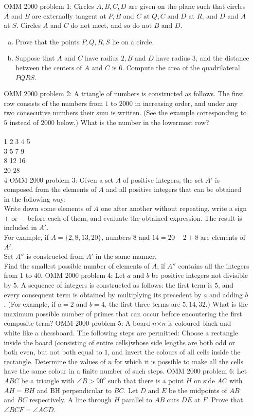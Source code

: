 OMM 2000 problem 1:  Circles $A,B,C,D$ are given on the plane such that circles $A$ and $B$ are externally tangent at $P, B$ and $C$ at $Q, C$ and $D$ at $R$, and $D$ and $A$ at $S$. Circles $A$ and $C$ do not meet, and so do not $B$ and $D$.
\begin{enumerate}[(a)]
  \item Prove that the points $P,Q,R,S$ lie on a circle.
  \item Suppose that $A$ and $C$ have radius $2, B$ and $D$ have radius $3$, and the distance between the centers of $A$ and $C$ is $6$. Compute the area of the quadrilateral $PQRS$.
\end{enumerate} 
OMM 2000 problem 2:  A triangle of numbers is constructed as follows. The first row consists of the numbers from $1$ to $2000$ in increasing order, and under any two consecutive numbers their sum is written. (See the example corresponding to $5$ instead of $2000$ below.) What is the number in the lowermost row? \\\\
1 2 3 4 5 \\
3 5 7 9 \\
8 12 16 \\
20 28 \\
4 
OMM 2000 problem 3:  Given a set $A$ of positive integers, the set $A'$ is composed from the elements of $A$ and all positive integers that can be obtained in the following way: \\
Write down some elements of $A$ one after another without repeating, write a sign $+ $ or $-$ before each of them, and evaluate the obtained expression. The result is included in $A'$. \\
For example, if $A = \{2,8,13,20\}$, numbers $8$ and $14 = 20-2+8$ are elements of $A'$. \\
Set $A''$ is constructed from $A'$ in the same manner. \\
Find the smallest possible number of elements of $A$, if $A''$ contains all the integers from $1$ to $40$. 
OMM 2000 problem 4:  Let $a$ and $b$ be positive integers not divisible by $5$. A sequence of integers is constructed as follows: the first term is $5$, and every consequent term is obtained by multiplying its precedent by $a$ and adding $b$. (For example, if $a = 2$ and $b = 4$, the first three terms are $5,14,32$.) What is the maximum possible number  of primes that can occur before encoutering the first composite term? 
OMM 2000 problem 5:  A board $n$×$n$ is coloured black and white like a chessboard. The following steps are permitted: Choose a rectangle inside the board (consisting of entire cells)whose side lengths are both odd or both even, but not both equal to $1$, and invert the colours of all cells inside the rectangle. Determine the values of $n$ for which it is possible to make all the cells have the same colour in a finite number of such steps. 
OMM 2000 problem 6:  Let $ABC$ be a triangle with $\angle B > 90^o$ such that there is a point $H$ on side $AC$ with $AH = BH$ and BH perpendicular to $BC$. Let $D$ and $E$ be the midpoints of $AB$ and $BC$ respectively. A line through $H$ parallel to $AB$ cuts $DE$ at $F$. Prove that $\angle BCF = \angle ACD$. 

